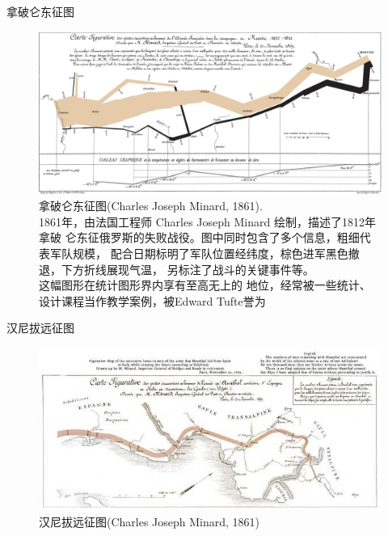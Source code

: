 \documentclass{beamerthemeMono}
\begin{document}
\begin{frame}{\subsecname}{拿破仑东征图}

  \begin{figure}
    \centering \includegraphics[width=0.8\columnwidth]{Minard.png}
    \caption{拿破仑东征图(Charles Joseph Minard, 1861). \\
      1861年，由法国工程师 Charles Joseph Minard 绘制，描述了1812年拿破
      仑东征俄罗斯的失败战役。图中同时包含了多个信息，粗细代表军队规模，
      配合日期标明了军队位置经纬度，棕色进军黑色撤退，下方折线展现气温，
      另标注了战斗的关键事件等。\\这幅图形在统计图形界内享有至高无上的
      地位，经常被一些统计、设计课程当作教学案例，被Edward
      Tufte\footnotemark[1]誉为}
  \end{figure}

\end{frame}

\begin{frame}{\subsecname}{汉尼拔远征图}

 \begin{figure}
   \centering \includegraphics[width=\columnwidth]{汉尼拔远征图.jpg}
   \caption{汉尼拔远征图(Charles Joseph Minard, 1861)}
 \end{figure}

\end{frame}
\end{document}
